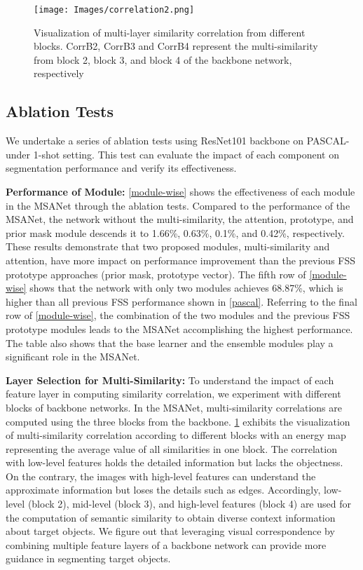 \documentclass[10pt,twocolumn,letterpaper]{article}
\begin{document}
\begin{figure}[t]
\centering
\texttt{[image: Images/correlation2.png]}
\caption{Visualization of multi-layer similarity correlation from different blocks. CorrB2, CorrB3 and CorrB4 represent the multi-similarity from block 2, block 3, and block 4 of the backbone network, respectively}
\label{fig:correlation}
\end{figure}

\subsection{Ablation Tests}
We undertake a series of ablation tests using ResNet101 backbone on PASCAL- under 1-shot setting. This test can evaluate the impact of each component on segmentation performance and verify its effectiveness.

\textbf{Performance of Module:} 
\cref{module-wise} shows the effectiveness of each module in the MSANet through the ablation tests. Compared to the performance of the MSANet, the network without the multi-similarity, the attention, prototype, and prior mask module descends it to 1.66\%, 0.63\%, 0.1\%, and 0.42\%, respectively. These results demonstrate that two proposed modules, multi-similarity and attention, have more impact on performance improvement than the previous FSS prototype approaches (prior mask, prototype vector). The fifth row of \cref{module-wise} shows that the network with only two modules achieves 68.87\%, which is higher than all previous FSS performance shown in \cref{pascal}. Referring to the final row of \cref{module-wise}, the combination of the two modules and the previous FSS prototype modules leads to the MSANet accomplishing the highest performance. The table also shows that the base learner and the ensemble modules play a significant role in the MSANet.

\textbf{Layer Selection for Multi-Similarity:}
To understand the impact of each feature layer in computing similarity correlation, we experiment with different blocks of backbone networks. In the MSANet, multi-similarity correlations are computed using the three blocks from the backbone. \cref{fig:correlation} exhibits the visualization of multi-similarity correlation according to different blocks with an energy map representing the average value of all similarities in one block. The correlation with low-level features holds the detailed information but lacks the objectness. On the contrary, the images with high-level features can understand the approximate information but loses the details such as edges. Accordingly, low-level (block 2), mid-level (block 3), and high-level features (block 4) are used for the computation of semantic similarity to obtain diverse context information about target objects. We figure out that leveraging visual correspondence by combining multiple feature layers of a backbone network can provide more guidance in segmenting target objects. 
\end{document}
